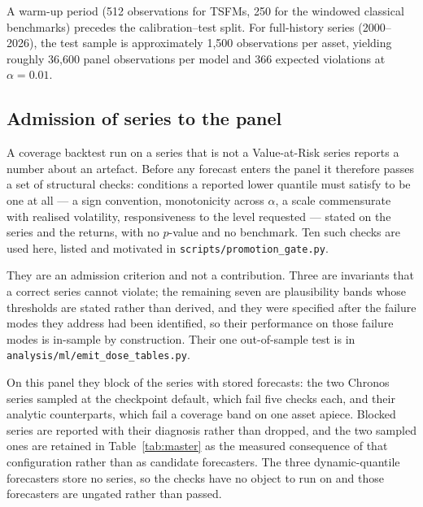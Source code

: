 \documentclass[preprint,11pt,authoryear]{elsarticle}
\newcommand{\1}{\boldsymbol{1}}
\begin{document}
A warm-up period (512 observations for TSFMs, 250 for the windowed classical benchmarks) precedes the calibration--test split. For full-history series (2000--2026), the test sample is approximately 1{,}500 observations per asset, yielding roughly 36{,}600 panel observations per model and 366 expected violations at $\alpha = 0.01$.




\subsection{Admission of series to the panel}
\label{sec:gate}

A coverage backtest run on a series that is not a Value-at-Risk series reports a
number about an artefact. Before any forecast enters the panel it therefore
passes a set of structural checks: conditions a reported lower quantile must
satisfy to be one at all --- a sign convention, monotonicity across $\alpha$, a
scale commensurate with realised volatility, responsiveness to the level
requested --- stated on the series and the returns, with no $p$-value and no
benchmark. Ten such checks are used here, listed and motivated in \texttt{scripts/promotion\_gate.py}.

They are an admission criterion and not a contribution. Three are invariants that
a correct series cannot violate; the remaining seven are plausibility bands whose
thresholds are stated rather than derived, and they were specified after the
failure modes they address had been identified, so their performance on those
failure modes is in-sample by construction. Their one out-of-sample test is in
\texttt{analysis/ml/emit\_dose\_tables.py}.

On this panel they block \nGateBlocked{} of the \nGateSeries{} series with stored
forecasts: the two Chronos series sampled at the checkpoint default, which fail
five checks each, and their analytic counterparts, which fail a coverage band on
one asset apiece. Blocked series are reported with their diagnosis rather than
dropped, and the two sampled ones are retained in Table~\ref{tab:master} as the
measured consequence of that configuration rather than as candidate forecasters.
The three dynamic-quantile forecasters store no series, so the checks have no
object to run on and those forecasters are ungated rather than passed.
\end{document}
